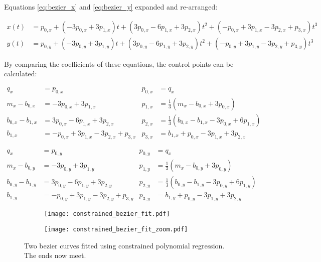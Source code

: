 Equations \ref{eq:bezier_x} and \ref{eq:bezier_y} expanded and re-arranged:

\begin{align}
    x(t) &= p_{0,x} + (-3p_{0,x} + 3p_{1,x})t + (3p_{0,x} - 6p_{1,x} + 3p_{2,x})t^2 + (-p_{0,x} + 3p_{1,x} - 3p_{2,x} + p_{3,x})t^3 \\
    y(t) &= p_{0,y} + (-3p_{0,y} + 3p_{1,y})t + (3p_{0,y} - 6p_{1,y} + 3p_{2,y})t^2 + (-p_{0,y} + 3p_{1,y} - 3p_{2,y} + p_{3,y})t^3
\end{align}

By comparing the coefficients of these equations, the control points can be calculated:

\begin{align}
    q_x               &= p_{0,x}              &
    p_{0,x} &= q_x \\
    m_x - b_{0,x}     &= -3p_{0,x} + 3p_{1,x} &
    p_{1,x} &= \frac{1}{3} (m_x - b_{0,x} + 3p_{0,x}) \\
    b_{0,x} - b_{1,x} &= 3p_{0,x} - 6p_{1,x} + 3p_{2,x} &
    p_{2,x} &= \frac{1}{3} (b_{0,x} - b_{1,x} - 3p_{0,x} + 6p_{1,x}) \\
    b_{1,x}           &= -p_{0,x} + 3p_{1,x} - 3p_{2,x} + p_{3,x} &
    p_{3,x} &= b_{1,x} + p_{0,x} - 3p_{1,x} + 3p_{2,x}
\end{align}

\begin{align}
    q_x               &= p_{0,y}              &
    p_{0,y} &= q_x \\
    m_x - b_{0,y}     &= -3p_{0,y} + 3p_{1,y} &
    p_{1,y} &= \frac{1}{3} (m_x - b_{0,y} + 3p_{0,y}) \\
    b_{0,y} - b_{1,y} &= 3p_{0,y} - 6p_{1,y} + 3p_{2,y} &
    p_{2,y} &= \frac{1}{3} (b_{0,y} - b_{1,y} - 3p_{0,y} + 6p_{1,y}) \\
    b_{1,y}           &= -p_{0,y} + 3p_{1,y} - 3p_{2,y} + p_{3,y} &
    p_{3,y} &= b_{1,y} + p_{0,y} - 3p_{1,y} + 3p_{2,y}
\end{align}

\begin{figure}
    \centering
    \begin{subfigure}{.45\linewidth}
        \centering
        \texttt{[image: constrained\_bezier\_fit.pdf]}
        \caption{}
    \end{subfigure}
        \begin{subfigure}{.45\linewidth}
        \centering
        \texttt{[image: constrained\_bezier\_fit\_zoom.pdf]}
        \caption{}
    \end{subfigure}
    \caption{Two bezier curves fitted using constrained polynomial regression.\\The ends now meet.}
    \label{fig:constrained_bezier_fit}
\end{figure}

